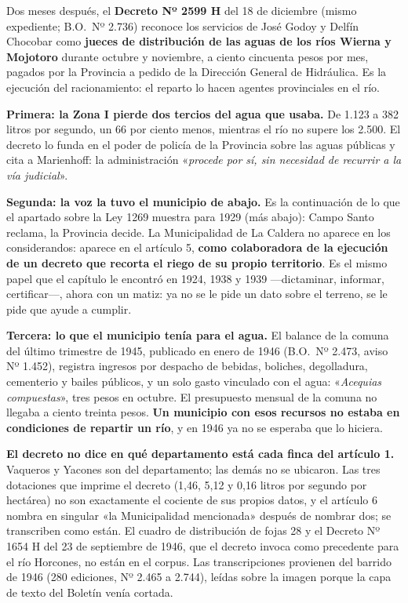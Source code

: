Dos meses después, el \textbf{Decreto Nº 2599 H} del 18 de diciembre (mismo expediente; B.O.\ Nº 2.736)
reconoce los servicios de José Godoy y Delfín Chocobar como \textbf{jueces de distribución de las
aguas de los ríos Wierna y Mojotoro} durante octubre y noviembre, a ciento cincuenta pesos por
mes, pagados por la Provincia a pedido de la Dirección General de Hidráulica. Es la ejecución
del racionamiento: el reparto lo hacen agentes provinciales en el río.

\textbf{Primera: la Zona I pierde dos tercios del agua que usaba.} De 1.123 a 382 litros por
segundo, un 66 por ciento menos, mientras el río no supere los 2.500. El decreto lo funda en
el poder de policía de la Provincia sobre las aguas públicas y cita a Marienhoff: la
administración «\textit{procede por sí, sin necesidad de recurrir a la vía judicial}».

\textbf{Segunda: la voz la tuvo el municipio de abajo.} Es la continuación de lo que el apartado
sobre la Ley 1269 muestra para 1929 (más abajo): Campo Santo reclama, la Provincia decide. La Municipalidad
de La Caldera no aparece en los considerandos: aparece en el artículo 5, \textbf{como
colaboradora de la ejecución de un decreto que recorta el riego de su propio territorio}. Es el
mismo papel que el capítulo le encontró en 1924, 1938 y 1939 ---dictaminar, informar,
certificar---, ahora con un matiz: ya no se le pide un dato sobre el terreno, se le pide que
ayude a cumplir.

\textbf{Tercera: lo que el municipio tenía para el agua.} El balance de la comuna del último
trimestre de 1945, publicado en enero de 1946 (B.O.\ Nº 2.473, aviso Nº 1.452), registra ingresos
por despacho de bebidas, boliches, degolladura, cementerio y bailes públicos, y un solo gasto
vinculado con el agua: «\textit{Acequias compuestas}», tres pesos en octubre. El presupuesto mensual
de la comuna no llegaba a ciento treinta pesos. \textbf{Un municipio con esos recursos no
estaba en condiciones de repartir un río}, y en 1946 ya no se esperaba que lo hiciera.

\begin{cautela}
\textbf{El decreto no dice en qué departamento está cada finca del artículo 1.} Vaqueros y Yacones
son del departamento; las demás no se ubicaron. Las tres dotaciones que imprime el decreto
(1,46, 5,12 y 0,16 litros por segundo por hectárea) no son exactamente el cociente de sus
propios datos, y el artículo 6 nombra en singular «la Municipalidad mencionada» después de
nombrar dos; se transcriben como están. El cuadro de distribución de fojas 28 y el Decreto
Nº 1654 H del 23 de septiembre de 1946, que el decreto invoca como precedente para el río
Horcones, no están en el corpus. Las transcripciones provienen del barrido de 1946 (280
ediciones, Nº 2.465 a 2.744), leídas sobre la imagen porque la capa de texto del Boletín venía
cortada. 
\end{cautela}

